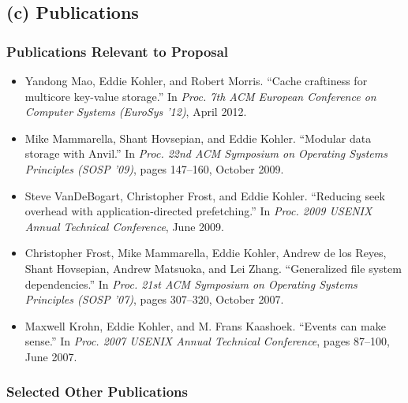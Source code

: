 \documentclass[11pt]{article}
\begin{document}
\subsection*{(c) Publications}

\subsubsection*{Publications Relevant to Proposal}

\begin{itemize}
\itemsep=0pt
\parsep=0pt
\leftmargin=0pt

\item Yandong Mao, Eddie Kohler, and Robert Morris.  ``Cache craftiness for
  multicore key-value storage.'' In \emph{Proc. 7th ACM European Conference
    on Computer Systems (EuroSys '12)}, April 2012.

\item Mike Mammarella, Shant Hovsepian, and Eddie Kohler. ``Modular data
  storage with Anvil.'' In \emph{Proc. 22nd ACM Symposium on Operating
  Systems Principles (SOSP '09)}, pages 147--160, October 2009.

\item Steve VanDeBogart, Christopher Frost, and Eddie Kohler. ``Reducing
  seek overhead with application-directed prefetching.'' In \emph{Proc. 2009
  USENIX Annual Technical Conference}, June 2009.

\item Christopher Frost, Mike Mammarella, Eddie Kohler, Andrew de los
  Reyes, Shant Hovsepian, Andrew Matsuoka, and Lei Zhang. ``Generalized
  file system dependencies.'' In \emph{Proc. 21st ACM Symposium on
  Operating Systems Principles (SOSP '07)}, pages 307--320, October 2007.

\item Maxwell Krohn, Eddie Kohler, and M. Frans Kaashoek. ``Events can make
  sense.'' In \emph{Proc. 2007 USENIX Annual Technical Conference}, pages
  87--100, June 2007.

\end{itemize}

\subsubsection*{Selected Other Publications}
\end{document}
